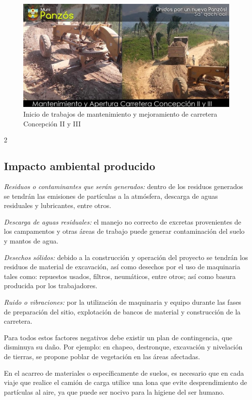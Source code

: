 \documentclass[12pt,spanish,Letterpaper,openany]{book}
\newcommand{\spacetwominus}{\vspace{-2mm}}
\begin{document}
\spacetwominus
\spacetwominus
\spacetwominus

\begin{figure}[H]

{\centering \includegraphics[width=0.7\linewidth]{images/image05_mgarcia} 

}

\caption{Inicio de trabajos de mantenimiento y mejoramiento de carretera Concepción II y III}\label{fig:unnamed-chunk-19}
\end{figure}

\begin {multicols}{2}

\spacetwominus
\spacetwominus

\hypertarget{impacto-ambiental-producido}{%
\subsection{Impacto ambiental producido}\label{impacto-ambiental-producido}}

\emph{Residuos o contaminantes que serán generados:} dentro de los residuos generados se tendrán las emisiones de partículas a la atmósfera, descarga de aguas residuales y lubricantes, entre otros.

\emph{Descarga de aguas residuales:} el manejo no correcto de excretas provenientes de los campamentos y otras áreas de trabajo puede generar contaminación del suelo y mantos de agua.

\emph{Desechos sólidos:} debido a la construcción y operación del proyecto se tendrán los residuos de material de excavación, así como desechos por el uso de maquinaria tales como: repuestos usados, filtros, neumáticos, entre otros; así como basura producida por los trabajadores.

\emph{Ruido o vibraciones:} por la utilización de maquinaria y equipo durante las fases de preparación del sitio, explotación de bancos de material y construcción de la carretera.

Para todos estos factores negativos debe existir un plan de contingencia, que disminuya su daño. Por ejemplo: en chapeo, destronque, excavación y nivelación de tierras, se propone poblar de vegetación en las áreas afectadas.

En el acarreo de materiales o específicamente de suelos, es necesario que en cada viaje que realice el camión de carga utilice una lona que evite desprendimiento de partículas al aire, ya que puede ser nocivo para la higiene del ser humano.

\end {multicols}
\end{document}
